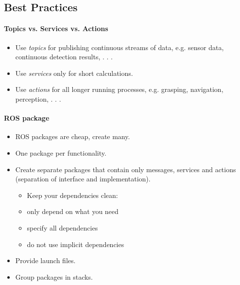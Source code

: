 \subsection{Best Practices}
\paragraph{Topics vs. Services vs. Actions\\}
\begin{itemize}
\item Use \textit{topics} for publishing continuous streams of data, e.g. sensor data, continuous detection results, . . .\\
\item Use \textit{services} only for short calculations.\\
\item Use \textit{actions} for all longer running processes, e.g. grasping, navigation, perception, . . .
\end{itemize}


\paragraph{ROS package}
\begin{itemize}
\item ROS packages are cheap, create many.
\item One package per functionality.
\item Create separate packages that contain only messages, services and
actions (separation of interface and implementation).
\begin{itemize}
\item Keep your dependencies clean:
\item only depend on what you need
\item specify all dependencies 
\item do not use implicit dependencies
\end{itemize}
\item Provide launch files.
\item Group packages in stacks.
\end{itemize}


